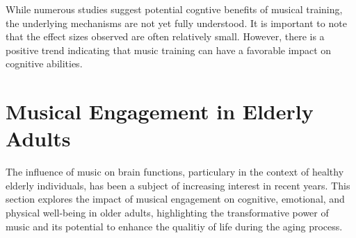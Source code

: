 While numerous studies suggest potential cogntive benefits of musical training, the underlying mechanisms are not yet fully understood. It is important to note that the effect sizes observed are often relatively small. However, there is a positive trend indicating that music training can have a favorable impact on cognitive abilities. 


\section{Musical Engagement in Elderly Adults}

The influence of music on brain functions, particulary in the context of healthy elderly individuals, has been a subject of increasing interest in recent years. This section explores the impact of musical engagement on cognitive, emotional, and physical well-being in older adults, highlighting the transformative power of music and its potential to enhance the qualitiy of life during the aging process.

